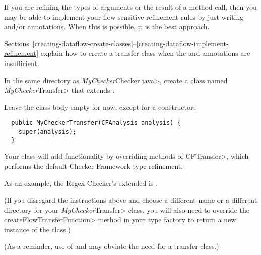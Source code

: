 If you are refining the types of arguments or the result of a method call,
then you may be able to implement your flow-sensitive refinement rules by
just writing  and/or
 annotations.
When this is possible, it is the best approach.

Sections~\ref{creating-dataflow-create-classes}--\ref{creating-dataflow-implement-refinement}
explain how to create a transfer class when the
 and
 annotations are insufficient.



In the same directory as \<\emph{MyChecker}Checker.java>, create a class
named \<\emph{MyChecker}Transfer> that extends
.

Leave the class body empty for now, except for a constructor:

\begin{Verbatim}
  public MyCheckerTransfer(CFAnalysis analysis) {
    super(analysis);
  }
\end{Verbatim}

\noindent
Your class will add functionality by
overriding methods of \<CFTransfer>, which performs the default Checker
Framework type refinement.

As an example, the Regex Checker's extended
 is
.

(If you disregard the instructions above and choose a different name or a
different directory for your \<\emph{MyChecker}Transfer> class, you will
also need to override the \<createFlowTransferFunction> method in your type
factory to return a new instance of the class.)

(As a reminder, use of  and
 may obviate the need for
a transfer class.)

